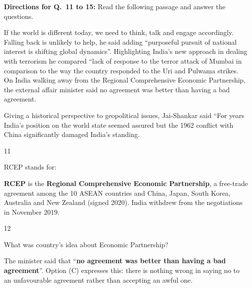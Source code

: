 \begin{context}
\textbf{Directions for Q.~11 to 15:} Read the following passage and answer the questions.\par\smallskip
If the world is different today, we need to think, talk and engage accordingly. Falling back is unlikely to help, he said adding ``purposeful pursuit of national interest is shifting global dynamics''. Highlighting India's new approach in dealing with terrorism he compared ``lack of response to the terror attack of Mumbai in comparison to the way the country responded to the Uri and Pulwama strikes. On India walking away from the Regional Comprehensive Economic Partnership, the external affair minister said no agreement was better than having a bad agreement.

Giving a historical perspective to geopolitical issues, Jai-Shankar said ``For years India's position on the world state seemed assured but the 1962 conflict with China significantly damaged India's standing.
\end{context}
\begin{question}{11}
{RCEP stands for:\par}
\begin{explain}
\textbf{RCEP} is the \textbf{Regional Comprehensive Economic Partnership}, a free-trade agreement among the 10 ASEAN countries and China, Japan, South Korea, Australia and New Zealand (signed 2020). India withdrew from the negotiations in November 2019.
\end{explain}
\end{question}

\begin{question}{12}
{What was country's idea about Economic Partnership?\par}
\begin{explain}
The minister said that ``\textbf{no agreement was better than having a bad agreement}''. Option (C) expresses this: there is nothing wrong in saying no to an unfavourable agreement rather than accepting an awful one.
\end{explain}
\end{question}

